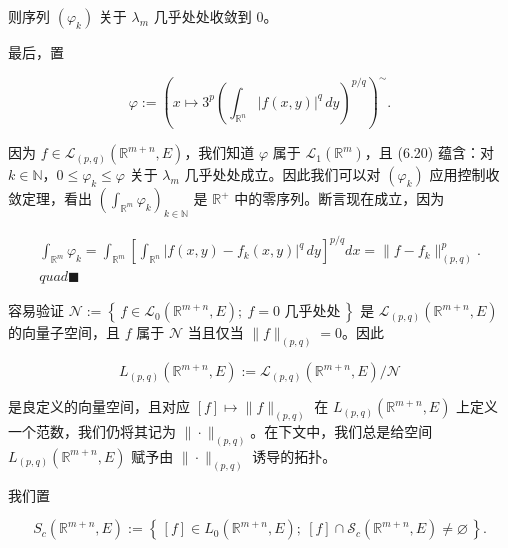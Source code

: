 \begin{lemma}
\begin{subitems}
则序列 $ (\varphi_{k}) $ 关于 $ \lambda_{m} $ 几乎处处收敛到 0。

\item

最后，置

\[
\varphi := \left(x \mapsto 3^{p}\left(\int_{\mathbb{R}^{n}}|f(x,y)|^{q}\,dy\right)^{p/q}\right)^{\sim} .
\]

因为 $ f \in \mathcal{L}_{(p,q)}(\mathbb{R}^{m+n},E) $，我们知道 $ \varphi $ 属于 $ \mathcal{L}_{1}(\mathbb{R}^{m}) $，且 (6.20) 蕴含：对 $ k \in \mathbb{N} $，$ 0 \le \varphi_{k} \le \varphi $ 关于 $ \lambda_{m} $ 几乎处处成立。因此我们可以对 $ (\varphi_{k}) $ 应用控制收敛定理，看出 $ (\int_{\mathbb{R}^{m}}\varphi_{k})_{k \in \mathbb{N}} $ 是 $ \mathbb{R}^{+} $ 中的零序列。断言现在成立，因为

\begin{equation*}
\begin{aligned}
\int_{\mathbb{R}^{m}}\varphi_{k} = \int_{\mathbb{R}^{m}}\left[\int_{\mathbb{R}^{n}}|f(x,y)-f_{k}(x,y)|^{q}\,dy\right]^{p/q}dx = \|f-f_{k}\|^{p}_{(p,q)} . \\quad\blacksquare
\end{aligned}
\end{equation*}
\end{subitems}

\end{lemma}

容易验证 $ \mathcal{N} := \left\{\, f \in \mathcal{L}_{0}(\mathbb{R}^{m+n},E) ;\ f = 0 \text{ 几乎处处} \,\right\} $ 是 $ \mathcal{L}_{(p,q)}(\mathbb{R}^{m+n},E) $ 的向量子空间，且 $ f $ 属于 $ \mathcal{N} $ 当且仅当 $ \|f\|_{(p,q)} = 0 $。因此

\[
L_{(p,q)}(\mathbb{R}^{m+n},E) := \mathcal{L}_{(p,q)}(\mathbb{R}^{m+n},E)/\mathcal{N}
\]

是良定义的向量空间，且对应 $ [f] \mapsto \|f\|_{(p,q)} $ 在 $ L_{(p,q)}(\mathbb{R}^{m+n},E) $ 上定义一个范数，我们仍将其记为 $ \|\cdot\|_{(p,q)} $。在下文中，我们总是给空间 $ L_{(p,q)}(\mathbb{R}^{m+n},E) $ 赋予由 $ \|\cdot\|_{(p,q)} $ 诱导的拓扑。

我们置

\[
S_{c}(\mathbb{R}^{m+n},E) := \left\{\, [f] \in L_{0}(\mathbb{R}^{m+n},E) ;\ [f] \cap \mathcal{S}_{c}(\mathbb{R}^{m+n},E) \ne \varnothing \,\right\} .
\]

